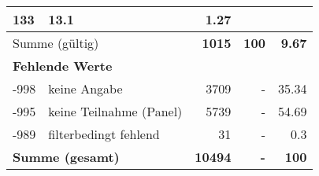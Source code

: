 \begin{longtable}{lXrrr}
       \num{133} &
       \num[round-mode=places,round-precision=2]{13,1} &
         \num[round-mode=places,round-precision=2]{1,27} \\
     \midrule
     \multicolumn{2}{l}{Summe (gültig)} &
       \textbf{\num{1015}} &
     \textbf{100} &
       \textbf{\num[round-mode=places,round-precision=2]{9,67}} \\
     \multicolumn{5}{l}{\textbf{Fehlende Werte}}\\
       -998 &
       keine Angabe &
         \num{3709} &
        - &
         \num[round-mode=places,round-precision=2]{35,34} \\
       -995 &
       keine Teilnahme (Panel) &
         \num{5739} &
        - &
         \num[round-mode=places,round-precision=2]{54,69} \\
       -989 &
       filterbedingt fehlend &
         \num{31} &
        - &
         \num[round-mode=places,round-precision=2]{0,3} \\
     \midrule
     \multicolumn{2}{l}{\textbf{Summe (gesamt)}} &
          \textbf{\num{10494}} &
        \textbf{-} &
        \textbf{100} \\
     \bottomrule
     \end{longtable}
     
